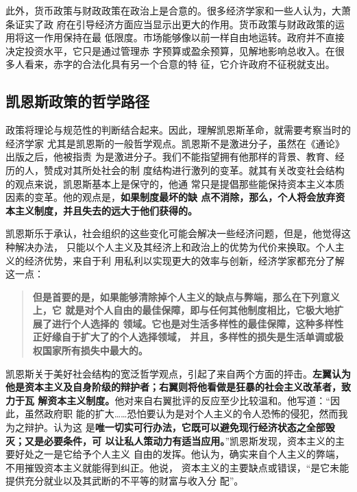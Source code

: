 此外，货币政策与财政政策在政治上是合意的。很多经济学家和一些人认为，大萧条证实了政
府在引导经济方面应当显示出更大的作用。货币政策与财政政策的运用将这一作用保持在最
低限度。市场能够像以前一样自由地运转。政府并不直接决定投资水平，它只是通过管理赤
字预算或盈余预算，见解地影响总收入。在很多人看来，赤字的合法化具有另一个合意的特
征，它介许政府不征税就支出。

\subsection{凯恩斯政策的哲学路径}

政策将理论与规范性的判断结合起来。因此，理解凯恩斯革命，就需要考察当时的经济学家
尤其是凯恩斯的一般哲学观点。凯恩斯不是激进分子，虽然在《通论》出版之后，他被指责
为是激进分子。我们不能指望拥有他那样的背景、教育、经历的人，赞成对其所处社会的制
度结构进行激列的变革。就其有关改变社会结构的观点来说，凯恩斯基本上是保守的，他通
常只是提倡那些能保持资本主义本质因素的变革。他的观点是，\textbf{如果制度最坏的缺
  点不消除，那么，个人将会放弃资本主义制度，并且失去的远大于他们获得的。}

凯恩斯乐于承认，社会组织的这些变化可能会解决一些经济问题，但是，他觉得这种解决办法，
只能以个人主义及其经济上和政治上的优势为代价来换取。个人主义的经济优势，来自于利
用私利以实现更大的效率与创新，经济学家都充分了解这一点：

\begin{quotation}
  \textbf{但是首要的是，如果能够清除掉个人主义的缺点与弊端，那么在下列意义上，它
    就是对个人自由的最佳保障，即与任何其他制度相比，它极大地扩展了进行个人选择的
    领域。它也是对生活多样性的最佳保障，这种多样性正好缘自于扩大了的个人选择领域，
    并且，多样性的损失是生活单调或极权国家所有损失中最大的。}
\end{quotation}

凯恩斯关于美好社会结构的宽泛哲学观点，引起了来自两个方面的抨击。\textbf{左翼认为
  他是资本主义及自身阶级的辩护者；右翼则将他看做是狂暴的社会主义改革者，致力于瓦
  解资本主义制度。}他对来自右翼批评的反应至少比较温和。他写道：“因此，虽然政府职
能的扩大……恐怕要认为是对个人主义的令人恐怖的侵犯，然而我为之辩护。认为这
是\textbf{唯一切实可行办法，它既可以避免现行经济状态之全部毁灭；又是必要条件，可
  以让私人策动力有适当应用。}”凯恩斯发现，资本主义的主要好处之一是它给予个人主义
自由的发挥。他认为，确实来自个人主义的弊端，不用摧毁资本主义就能得到纠正。他说，
资本主义的主要缺点或错误，“是它未能提供充分就业以及其武断的不平等的财富与收入分
配”。

